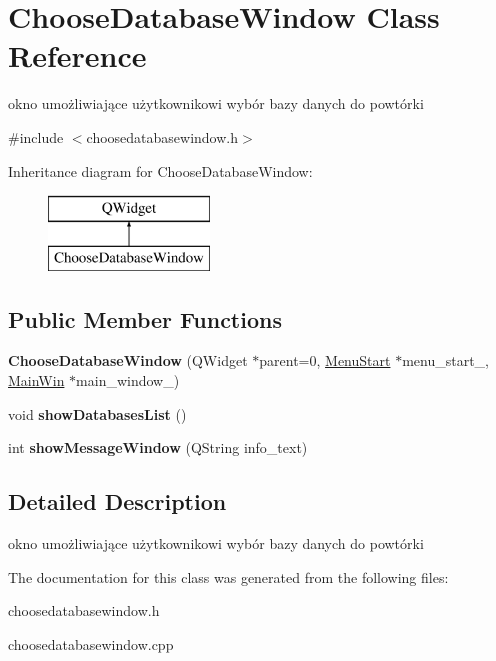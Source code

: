\hypertarget{class_choose_database_window}{}\section{Choose\+Database\+Window Class Reference}
\label{class_choose_database_window}


okno umożliwiające użytkownikowi wybór bazy danych do powtórki  




{\ttfamily \#include $<$choosedatabasewindow.\+h$>$}

Inheritance diagram for Choose\+Database\+Window\+:\begin{figure}[H]
\begin{center}
\leavevmode
\includegraphics[height=2.000000cm]{class_choose_database_window}
\end{center}
\end{figure}
\subsection*{Public Member Functions}
\begin{DoxyCompactItemize}
\item 
\mbox{\label{class_choose_database_window_a97a5d367fea9c9f51cf74e898626c5a8}} 
{\bfseries Choose\+Database\+Window} (Q\+Widget $\ast$parent=0, \mbox{\hyperlink{class_menu_start}{Menu\+Start}} $\ast$menu\+\_\+start\+\_, \mbox{\hyperlink{class_main_win}{Main\+Win}} $\ast$main\+\_\+window\+\_)
\item 
\mbox{\label{class_choose_database_window_a8bb827c6d1f1e60a1ea091c8ff9ef591}} 
void {\bfseries show\+Databases\+List} ()
\item 
\mbox{\label{class_choose_database_window_aa63c9e154637a45f33da4354a4761bce}} 
int {\bfseries show\+Message\+Window} (Q\+String info\+\_\+text)
\end{DoxyCompactItemize}


\subsection{Detailed Description}
okno umożliwiające użytkownikowi wybór bazy danych do powtórki 

The documentation for this class was generated from the following files\+:\begin{DoxyCompactItemize}
\item 
choosedatabasewindow.\+h\item 
choosedatabasewindow.\+cpp\end{DoxyCompactItemize}
